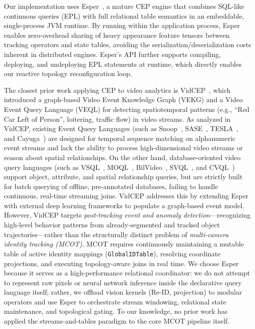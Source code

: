 \documentclass[11pt]{article}
\begin{document}
Our implementation uses Esper~\cite{espertech2024}, a mature CEP engine that combines SQL-like continuous queries (EPL) with full relational table semantics in an embeddable, single-process JVM runtime. By running within the application process, Esper enables zero-overhead sharing of heavy appearance feature tensors between tracking operators and state tables, avoiding the serialization/deserialization costs inherent in distributed engines. Esper's API further supports compiling, deploying, and undeploying EPL statements at runtime, which directly enables our reactive topology reconfiguration loop.

The closest prior work applying CEP to video analytics is VidCEP~\cite{yadav2019vidcep}, which introduced a graph-based Video Event Knowledge Graph (VEKG) and a Video Event Query Language (VEQL) for detecting spatiotemporal patterns (e.g., ``Red Car Left of Person'', loitering, traffic flow) in video streams. As analyzed in VidCEP, existing Event Query Languages (such as Snoop~\cite{chakravarthy1994snoop}, SASE~\cite{wu2006sase}, TESLA~\cite{cugola2010tesla}, and Cayuga~\cite{demers2007cayuga}) are designed for temporal sequence matching on alphanumeric event streams and lack the ability to process high-dimensional video streams or reason about spatial relationships. On the other hand, database-oriented video query languages (such as VSQL~\cite{10.1145/951676.951682}, MOQL~\cite{li1997moql}, BilVideo~\cite{donderler2005bilvideo}, SVQL~\cite{lu2015svql}, and CVQL~\cite{le2008query}) support object, attribute, and spatial relationship queries, but are strictly built for batch querying of offline, pre-annotated databases, failing to handle continuous, real-time streaming joins. VidCEP addresses this by extending Esper with external deep learning frameworks to populate a graph-based event model. However, VidCEP targets \emph{post-tracking event and anomaly detection}---recognizing high-level behavior patterns from already-segmented and tracked object trajectories---rather than the structurally distinct problem of \emph{multi-camera identity tracking (MCOT)}. MCOT requires continuously maintaining a mutable table of active identity mappings (\texttt{GlobalIDTable}), resolving coordinate projections, and executing topology-aware joins in real time. We choose Esper because it serves as a high-performance relational coordinator: we do not attempt to represent raw pixels or neural network inference inside the declarative query language itself; rather, we offload vision kernels (Re-ID, projection) to modular operators and use Esper to orchestrate stream windowing, relational state maintenance, and topological gating. To our knowledge, no prior work has applied the streams-and-tables paradigm to the core MCOT pipeline itself.
\end{document}
